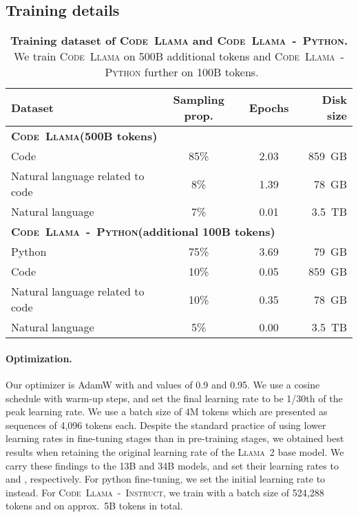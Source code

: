 \documentclass[10pt]{article}
\newcommand{\model}{\textsc{Code~Llama}\xspace}
\newcommand{\instmodel}{\textsc{Code~Llama~-~Instruct}\xspace}
\newcommand{\pymodel}{\textsc{Code~Llama~-~Python}\xspace}
\newcommand{\llamavtwo}{\textsc{Llama~2}\xspace}
\begin{document}
\subsection{Training details}
\begin{table}[t]
    \centering
    \setlength{\tabcolsep}{3pt}
    \begin{tabular}{@{}l@{}ccr@{}}
    \toprule
  Dataset &  Sampling prop. & Epochs &  Disk size \\  \midrule
\multicolumn{4}{l}{\textbf{\model (500B tokens)}} \\ 
  Code     & 85\%  & 2.03 & 859~GB \\
  Natural language related to code             & 8\%  & 1.39 & 78~GB \\
  Natural language    & 7\%  & 0.01 & 3.5~TB \\
  \midrule
\multicolumn{4}{l}{\textbf{\pymodel (additional 100B tokens)}} \\ 
  Python & 75\% & 3.69 & 79~GB\\ 
  Code    & 10\%  & 0.05 & 859~GB \\
  Natural language related to code & 10\%  & 0.35 & 78~GB \\
  Natural language    & 5\%  & 0.00 & 3.5~TB \\
  \bottomrule  
    \end{tabular}    
    \caption{\textbf{Training dataset of \model and \pymodel.} We train \model on 500B additional tokens and \pymodel further on 100B tokens.
    \label{tab:dataset}}
\end{table}

\paragraph{Optimization.}
Our optimizer is AdamW \citep{loshchilov2019decoupled} with  and  values of 0.9 and 0.95. We use a cosine schedule with  warm-up steps, and set the final learning rate to be 1/30th of the peak learning rate. 
We use a batch size of 4M tokens which are presented as sequences of 4,096 tokens each. 
Despite the standard practice of using lower learning rates in fine-tuning stages than in pre-training stages, we obtained best results when retaining the original learning rate of the \llamavtwo base model. We carry these findings to the 13B and 34B models, and set their learning rates to  and , respectively.
For python fine-tuning, we set the initial learning rate to  instead.
For \instmodel, we train with a batch size of 524,288 tokens and on approx.\ 5B tokens in total. 
\end{document}
